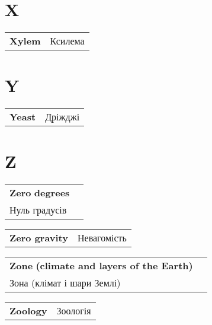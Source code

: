 \documentclass[a5paper,10pt]{book}
\makeatletter
\newcommand{\entry}[2]{%
  \noindent\begin{tabularx}{\linewidth}{@{}X@{}r@{}}
    \textbf{#1}\dotfill & #2 \\
  \end{tabularx}
}
\newcommand{\multientry}[3]{%
  \noindent\begin{tabularx}{\linewidth}{@{}X@{}r@{}}
    \textbf{#1}  \textbf{ #2} & \\[-0.5ex]
    \dotfill  #3 \\
  \end{tabularx}
}
\makeatother
\begin{document}
\begin{multicols}{2}
\section*{X}
\entry{Xylem}{\textukrainian{Ксилема}}
\section*{Y}
\entry{Yeast}{\textukrainian{Дріжджі}}
\section*{Z}
\multientry{Zero}{degrees}{\textukrainian{Нуль градусів}}
\entry{Zero gravity}{\textukrainian{Невагомість}}
\multientry{Zone}{(climate and layers of the Earth)}{\textukrainian{Зона (клімат і шари Землі)}}
\entry{Zoology}{\textukrainian{Зоологія}}
\end{multicols}
\end{document}
